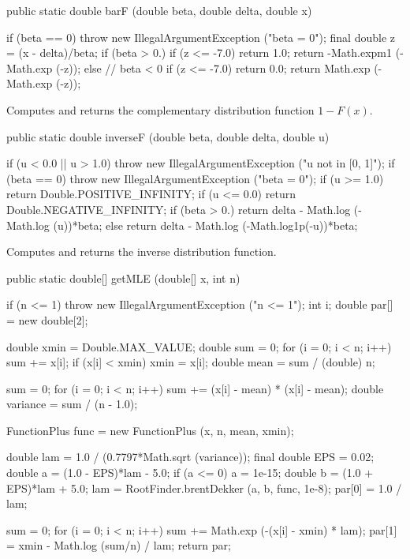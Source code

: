 \begin{code}

   public static double barF (double beta, double delta, double x)\begin{hide} {
      if (beta == 0)
         throw new IllegalArgumentException ("beta = 0");
      final double z = (x - delta)/beta;
      if (beta > 0.) {
         if (z <= -7.0)
            return 1.0;
         return -Math.expm1 (-Math.exp (-z));
      } else {   // beta < 0
          if (z <= -7.0)
            return 0.0;
         return Math.exp (-Math.exp (-z));
      }
   }\end{hide}
\end{code}
 \begin{tabb}
  Computes and returns  the complementary distribution function $1 - F(x)$.
 \end{tabb}
\begin{code}

   public static double inverseF (double beta, double delta, double u)\begin{hide} {
       if (u < 0.0 || u > 1.0)
          throw new IllegalArgumentException ("u not in [0, 1]");
      if (beta == 0)
         throw new IllegalArgumentException ("beta = 0");
       if (u >= 1.0)
           return Double.POSITIVE_INFINITY;
       if (u <= 0.0)
           return Double.NEGATIVE_INFINITY;
       if (beta > 0.)
          return delta - Math.log (-Math.log (u))*beta;
       else
          return delta - Math.log (-Math.log1p(-u))*beta;
   }\end{hide}
\end{code}
  \begin{tabb}
  Computes and returns the inverse distribution function.
 \end{tabb}
\begin{code}

   public static double[] getMLE (double[] x, int n)\begin{hide} {
      if (n <= 1)
         throw new IllegalArgumentException ("n <= 1");
      int i;
      double par[] = new double[2];

      double xmin = Double.MAX_VALUE;
      double sum = 0;
      for (i = 0; i < n; i++) {
         sum += x[i];
         if (x[i] < xmin)
            xmin = x[i];
      }
      double mean = sum / (double) n;

      sum = 0;
      for (i = 0; i < n; i++)
         sum += (x[i] - mean) * (x[i] - mean);
      double variance = sum / (n - 1.0);

      FunctionPlus func = new FunctionPlus (x, n, mean, xmin);

      double lam = 1.0 / (0.7797*Math.sqrt (variance));
      final double EPS = 0.02;
      double a = (1.0 - EPS)*lam - 5.0;
      if (a <= 0)
         a = 1e-15;
      double b = (1.0 + EPS)*lam + 5.0;
      lam = RootFinder.brentDekker (a, b, func, 1e-8);
      par[0] = 1.0 / lam;

      sum = 0;
      for (i = 0; i < n; i++)
           sum += Math.exp (-(x[i] - xmin) * lam);
      par[1] = xmin - Math.log (sum/n) / lam;
      return par;
   }\end{hide}
\end{code}
